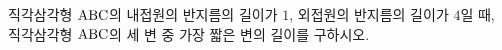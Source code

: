 직각삼각형 $\mathrm{ABC}$의 내접원의 반지름의 길이가 $1$, 외접원의 반지름의 길이가 $4$일 때, 직각삼각형 $\mathrm{ABC}$의 세 변 중 가장 짧은 변의 길이를 구하시오.
